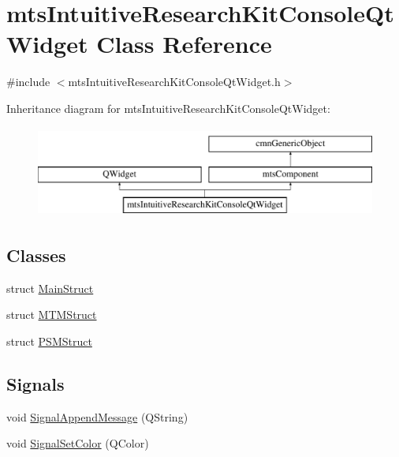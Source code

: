 \hypertarget{classmts_intuitive_research_kit_console_qt_widget}{}\section{mts\+Intuitive\+Research\+Kit\+Console\+Qt\+Widget Class Reference}
\label{classmts_intuitive_research_kit_console_qt_widget}


{\ttfamily \#include $<$mts\+Intuitive\+Research\+Kit\+Console\+Qt\+Widget.\+h$>$}

Inheritance diagram for mts\+Intuitive\+Research\+Kit\+Console\+Qt\+Widget\+:\begin{figure}[H]
\begin{center}
\leavevmode
\includegraphics[height=3.000000cm]{db/d8b/classmts_intuitive_research_kit_console_qt_widget}
\end{center}
\end{figure}
\subsection*{Classes}
\begin{DoxyCompactItemize}
\item 
struct \hyperlink{structmts_intuitive_research_kit_console_qt_widget_1_1_main_struct}{Main\+Struct}
\item 
struct \hyperlink{structmts_intuitive_research_kit_console_qt_widget_1_1_m_t_m_struct}{M\+T\+M\+Struct}
\item 
struct \hyperlink{structmts_intuitive_research_kit_console_qt_widget_1_1_p_s_m_struct}{P\+S\+M\+Struct}
\end{DoxyCompactItemize}
\subsection*{Signals}
\begin{DoxyCompactItemize}
\item 
void \hyperlink{classmts_intuitive_research_kit_console_qt_widget_a8b2a92a9c140b8022613cf9ff86af71a}{Signal\+Append\+Message} (Q\+String)
\item 
void \hyperlink{classmts_intuitive_research_kit_console_qt_widget_a08dbe41b123cb8cebf7695e0190b3a56}{Signal\+Set\+Color} (Q\+Color)
\end{DoxyCompactItemize}
